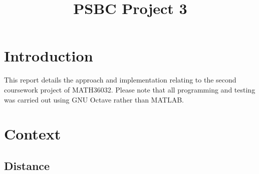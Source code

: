\documentclass[10pt]{article}
\title{PSBC Project 3}
\newcommand{\inlinemaketitle}{{\let\newpage\relax\maketitle}}
\begin{document}
\inlinemaketitle
\section{Introduction}

This report details the approach and implementation relating to the second coursework project of MATH36032. Please note that all programming and testing was carried out using GNU Octave rather than MATLAB.

\section{Context}



\begin{appendices}

\section{Distance}\label{ap:distance}

\end{appendices}
\end{document}
